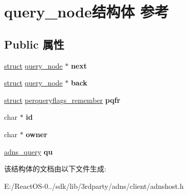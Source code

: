 \hypertarget{structquery__node}{}\section{query\+\_\+node结构体 参考}
\label{structquery__node}
\subsection*{Public 属性}
\begin{DoxyCompactItemize}
\item 
\mbox{\label{structquery__node_a72fa659fb104171f70469160a1262fda}} 
\hyperlink{interfacestruct}{struct} \hyperlink{structquery__node}{query\+\_\+node} $\ast$ {\bfseries next}
\item 
\mbox{\label{structquery__node_a9a84df7fb85f9e3243778697717a554c}} 
\hyperlink{interfacestruct}{struct} \hyperlink{structquery__node}{query\+\_\+node} $\ast$ {\bfseries back}
\item 
\mbox{\label{structquery__node_ad6dd1af7af9a684b4bacbe2e7c87e24d}} 
\hyperlink{interfacestruct}{struct} \hyperlink{structperqueryflags__remember}{perqueryflags\+\_\+remember} {\bfseries pqfr}
\item 
\mbox{\label{structquery__node_a97ad6ca81d8128bbd441c681273a0286}} 
char $\ast$ {\bfseries id}
\item 
\mbox{\label{structquery__node_a412f782f5295235ceced47b9b69ff858}} 
char $\ast$ {\bfseries owner}
\item 
\mbox{\label{structquery__node_acc25842ea9c2c52673cb674fe08ac4b5}} 
\hyperlink{structadns____query}{adns\+\_\+query} {\bfseries qu}
\end{DoxyCompactItemize}


该结构体的文档由以下文件生成\+:\begin{DoxyCompactItemize}
\item 
E\+:/\+React\+O\+S-\/0../sdk/lib/3rdparty/adns/client/adnshost.\+h\end{DoxyCompactItemize}
